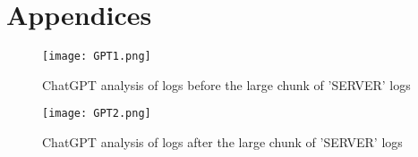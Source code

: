 \documentclass[
	letterpaper, %
	10pt, %
	unnumberedsections, %
	twoside, %
]{APAAssignment}
\begin{document}
\appendix


\clearpage
\chapter{Appendices}
\begin{appendices}
\begin{figure}[!htp] %
	\centering
	\texttt{[image: GPT1.png]}
	\caption{ChatGPT analysis of logs before the large chunk of 'SERVER' logs}	\label{fig:GPT1.png}
\end{figure}
\begin{figure}[!htp] %
	\centering
	\texttt{[image: GPT2.png]}
	\caption{ChatGPT analysis of logs after the large chunk of 'SERVER' logs}	\label{fig:GPT2.png}
\end{figure}



\end{appendices}
\end{document}
